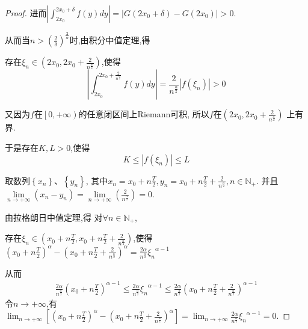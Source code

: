 \documentclass[lang=cn,newtx,10pt,scheme=chinese]{elegantbook}
\begin{document}
\begin{proof}
进而$\left| \int_{2x_0}^{2x_0+\delta}{f\left( y \right) dy} \right|=\left| G\left( 2x_0+\delta \right) -G\left( 2x_0 \right) \right|>0$.

从而当$n>\left( \frac{2}{\delta} \right) ^{\frac{2}{\alpha}}$时,由积分中值定理,得

存在$\xi _n\in \left( 2x_0,2x_0+\frac{2}{n^{\frac{\alpha}{2}}} \right) $,使得
\begin{equation}\label{A}
    \left| \int_{2x_0}^{2x_0+\frac{2}{n^{\frac{\alpha}{2}}}}{f\left( y \right) dy} \right|=\frac{2}{n^{\frac{\alpha}{2}}}\left| f\left( \xi _n \right) \right|>0
\end{equation}

又因为$f$在$\left[ 0,+\infty \right)$的任意闭区间上Riemann可积,
所以$f$在$\left( 2x_0,2x_0+\frac{2}{n^{\frac{\alpha}{2}}} \right) $
上有界.

于是存在$K,L> 0$,使得
\begin{equation}\label{B}
  K\leqslant \left| f\left( \xi _n \right) \right|\leqslant L
\end{equation}

取数列$\left\{ x_n \right\} \text{、}\left\{ y_n \right\} $,
其中$x_n=x_0+n\frac{T}{2},y_n=x_0+n\frac{T}{2}+\frac{2}{n^{\frac{\alpha}{2}}},n\in \mathbb{N} _+$.
并且$\underset{n\rightarrow +\infty}{\lim}\left( x_n-y_n \right) =\underset{n\rightarrow +\infty}{\lim}\left( \frac{2}{n^{\frac{\alpha}{2}}} \right) =0$.

由拉格朗日中值定理,得
对$\forall n\in \mathbb{N} _+$,

存在$\xi _n\in \left( x_0+n\frac{T}{2},x_0+n\frac{T}{2}+\frac{2}{n^{\frac{\alpha}{2}}} \right) $,使得
$\left( x_0+n\frac{T}{2} \right) ^{\alpha}-\left( x_0+n\frac{T}{2}+\frac{2}{n^{\frac{\alpha}{2}}} \right) ^{\alpha}=\frac{2\alpha}{n^{\frac{\alpha}{2}}}{\xi _n}^{\alpha -1}$

从而
\begin{equation}
  \begin{split}
    \frac{2\alpha}{n^{\frac{\alpha}{2}}}\left( x_0+n\frac{T}{2} \right) ^{\alpha -1}\leqslant \frac{2\alpha}{n^{\frac{\alpha}{2}}}{\xi _n}^{\alpha -1}\leqslant \frac{2\alpha}{n^{\frac{\alpha}{2}}}\left( x_0+n\frac{T}{2}+\frac{2}{n^{\frac{\alpha}{2}}} \right) ^{\alpha -1}
  \end{split}
  \nonumber
\end{equation}
令$n\rightarrow +\infty$,有$\lim_{n\rightarrow +\infty} \left[ \left( x_0+n\frac{T}{2} \right) ^{\alpha}-\left( x_0+n\frac{T}{2}+\frac{2}{n^{\frac{\alpha}{2}}} \right) ^{\alpha} \right] =\lim_{n\rightarrow +\infty} \frac{2\alpha}{n^{\frac{\alpha}{2}}}{\xi _n}^{\alpha -1}=0$.


\end{proof}
\end{document}

